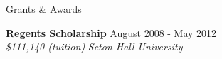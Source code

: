 \documentclass{resume} %
\begin{document}
\begin{minipage}{\textwidth}
\begin{rSection}{Grants \& Awards}

{\bf Regents Scholarship} \hfill {August 2008 - May 2012} \\ 
{\em \$111,140 (tuition)} \hfill {\em Seton Hall University} \\



\end{rSection}
\end{minipage}


\vspace{.25cm}
\end{document}
